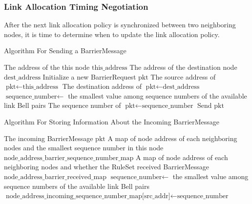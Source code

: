 \subsubsection{Link Allocation Timing Negotiation}

After the next link allocation policy is synchronized between two neighboring nodes, it is time to determine when to update the link allocation policy.
\begin{algorithm}[H]  
  \begin{minipage}{0.8\linewidth}
  \caption{Algorithm For Sending a BarrierMessage}             
  \begin{algorithmic}[1]
    \Require The address of the this node $\text{this\_address}$      
    \Require The address of the destination node $\text{dest\_address}$    
    \State Initialize a new BarrierRequest $\text{pkt}$
    \State The source address of $\text{pkt} \gets \text{this\_address}$
    \State The destination address of $\text{pkt} \gets \text{dest\_address}$
    \State $\text{sequence\_number} \gets$ the smallest value among sequence numbers of the available link Bell pairs
    \State The sequence number of $\text{pkt} \gets \text{sequence\_number}$
    \State Send $\text{pkt}$
  \end{algorithmic}
\end{minipage}
\end{algorithm}

\begin{algorithm}[H]  
  \begin{minipage}{0.8\linewidth}
  \caption{Algorithm For Storing Information About the Incoming BarrierMessage}                 
  \begin{algorithmic}[1]
  \Require The incoming BarrierMessage $\text{pkt}$
    \Require A map of node address of each neighboring nodes and the smallest sequence number in this node $\text{node\_address\_barrier\_sequence\_number\_map}$
    \Require A map of node address of each neighboring nodes and whether the RuleSet received BarrierMessage $\text{node\_address\_barrier\_received\_map}$
    \State $\text{sequence\_number} \gets$ the smallest value among sequence numbers of the available link Bell pairs
    \State $\text{node\_address\_incoming\_sequence\_number\_map[src\_addr]} \gets \text{sequence\_number}$
  \end{algorithmic}
\end{minipage}
\end{algorithm}

